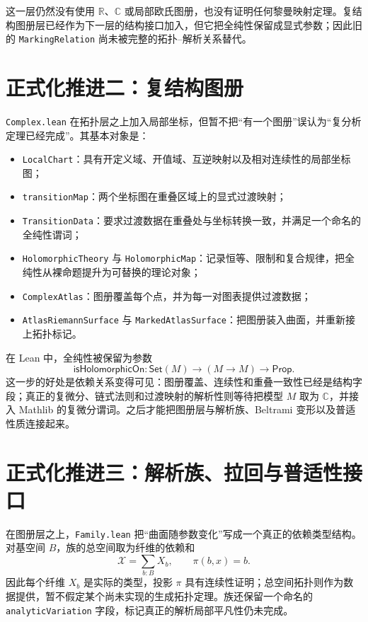 \documentclass[UTF8,fontset=none,a4paper,11pt]{ctexart}
\begin{document}
这一层仍然没有使用 $\mathbb R$、$\mathbb C$ 或局部欧氏图册，也没有证明任何黎曼映射定理。复结构图册层已经作为下一层的结构接口加入，但它把全纯性保留成显式参数；因此旧的 \texttt{MarkingRelation} 尚未被完整的拓扑--解析关系替代。

\section{正式化推进二：复结构图册}

\texttt{Complex.lean} 在拓扑层之上加入局部坐标，但暂不把“有一个图册”误认为“复分析定理已经完成”。其基本对象是：

\begin{itemize}
  \item \texttt{LocalChart}：具有开定义域、开值域、互逆映射以及相对连续性的局部坐标图；
  \item \texttt{transitionMap}：两个坐标图在重叠区域上的显式过渡映射；
  \item \texttt{TransitionData}：要求过渡数据在重叠处与坐标转换一致，并满足一个命名的全纯性谓词；
  \item \texttt{HolomorphicTheory} 与 \texttt{HolomorphicMap}：记录恒等、限制和复合规律，把全纯性从裸命题提升为可替换的理论对象；
  \item \texttt{ComplexAtlas}：图册覆盖每个点，并为每一对图表提供过渡数据；
  \item \texttt{AtlasRiemannSurface} 与 \texttt{MarkedAtlasSurface}：把图册装入曲面，并重新接上拓扑标记。
\end{itemize}

在 Lean 中，全纯性被保留为参数
\[
  \mathsf{isHolomorphicOn}:\mathsf{Set}(M)\to(M\to M)\to\mathsf{Prop}.
\]
这一步的好处是依赖关系变得可见：图册覆盖、连续性和重叠一致性已经是结构字段；真正的复微分、链式法则和过渡映射的解析性则等待把模型 $M$ 取为 $\mathbb C$，并接入 Mathlib 的复微分谓词。之后才能把图册层与解析族、Beltrami 变形以及普适性质连接起来。

\section{正式化推进三：解析族、拉回与普适性接口}

在图册层之上，\texttt{Family.lean} 把“曲面随参数变化”写成一个真正的依赖类型结构。对基空间 $B$，族的总空间取为纤维的依赖和
\[
  \mathcal X=\sum_{b:B}X_b,
  \qquad \pi(b,x)=b.
\]
因此每个纤维 $X_b$ 是实际的类型，投影 $\pi$ 具有连续性证明；总空间拓扑则作为数据提供，暂不假定某个尚未实现的生成拓扑定理。族还保留一个命名的 \texttt{analyticVariation} 字段，标记真正的解析局部平凡性仍未完成。
\end{document}
